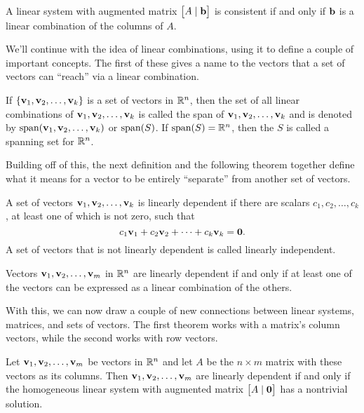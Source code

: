 \documentclass[../m73main.tex]{subfiles}
\begin{document}
\begin{theorem}
	A linear system with augmented matrix $\begin{bmatrix} A \;|\; \mathbf{b} \end{bmatrix}$ is consistent if and only if $\mathbf{b}$ is a linear combination of the columns of $A$.
\end{theorem}

We'll continue with the idea of linear combinations, using it to define a couple of important concepts.
The first of these gives a name to the vectors that a set of vectors can ``reach'' via a linear combination.

\begin{definition}[Span]
	If $\{\mathbf{v}_1, \mathbf{v}_2, \ldots, \mathbf{v}_k\}$ is a set of vectors in $\mathbb{R}^n$, then the set of all linear combinations of $\mathbf{v}_1, \mathbf{v}_2, \ldots, \mathbf{v}_k$ is called the span of $\mathbf{v}_1, \mathbf{v}_2, \ldots, \mathbf{v}_k$ and is denoted by $\textrm{span}(\mathbf{v}_1, \mathbf{v}_2, \ldots, \mathbf{v}_k)$ or $\textrm{span}(S)$.
	If $\textrm{span}(S) = \mathbb{R}^n$, then the $S$ is called a spanning set for $\mathbb{R}^n$.
\end{definition}

Building off of this, the next definition and the following theorem together define what it means for a vector to be entirely ``separate'' from another set of vectors.

\begin{definition}
	A set of vectors $\mathbf{v}_1, \mathbf{v}_2, \ldots, \mathbf{v}_k$ is linearly dependent if there are scalars $c_1, c_2, \ldots, c_k$, at least one of which is not zero, such that
	\[ c_1 \mathbf{v}_1 + c_2 \mathbf{v}_2 + \cdots + c_k \mathbf{v}_k = \mathbf{0}. \]
	A set of vectors that is not linearly dependent is called linearly independent.
\end{definition}

\begin{theorem}
	Vectors $\mathbf{v}_1, \mathbf{v}_2, \ldots, \mathbf{v}_m$ in $\mathbb{R}^n$ are linearly dependent if and only if at least one of the vectors can be expressed as a linear combination of the others.
\end{theorem}

With this, we can now draw a couple of new connections between linear systems, matrices, and sets of vectors.
The first theorem works with a matrix's column vectors, while the second works with row vectors.

\begin{theorem}
	Let $\mathbf{v}_1, \mathbf{v}_2, \ldots, \mathbf{v}_m$ be vectors in $\mathbb{R}^n$ and let $A$ be the $n \times m$ matrix with these vectors as its columns.
	Then $\mathbf{v}_1, \mathbf{v}_2, \ldots, \mathbf{v}_m$ are linearly dependent if and only if the homogeneous linear system with augmented matrix $\begin{bmatrix} A \;|\; \mathbf{0} \end{bmatrix}$ has a nontrivial solution.
\end{theorem}
\end{document}

